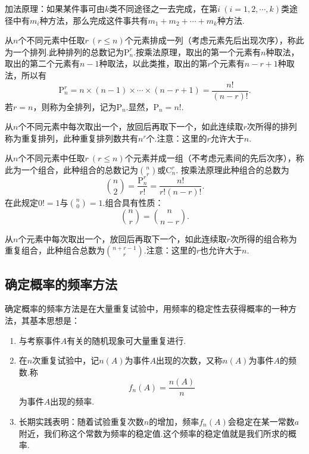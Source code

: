 加法原理：如果某件事可由$k$类不同途径之一去完成，在第$i\ (i=1,2,\cdots,k)$类途径中有$m_i$种方法，那么完成这件事共有$m_1+m_2+\cdots+m_k$种方法.
\begin{definition}[排列]
	从$n$个不同元素中任取$r\ (r\leqslant n)$个元素排成一列（考虑元素先后出现次序），称此为一个{\heiti 排列}.此种排列的总数记为$\mathrm{P}_n^r$.按乘法原理，取出的第一个元素有$n$种取法，取出的第二个元素有$n-1$种取法，以此类推，取出的第$r$个元素有$n-r+1$种取法，所以有
	$$\mathrm{P}_n^r=n\times(n-1)\times\cdots\times(n-r+1)=\frac{n!}{(n-r)!}.$$
	若$r=n$，则称为{\heiti 全排列}，记为$\mathrm{P}_n$.显然，$\mathrm{P}_n=n!$.
\end{definition}
\begin{definition}[重复排列]
	从$n$个不同元素中每次取出一个，放回后再取下一个，如此连续取$r$次所得的排列称为{\heiti 重复排列}，此种重复排列数共有$n^r$个.注意：这里的$r$允许大于$n$.
\end{definition}
\begin{definition}[组合]
	从$n$个不同元素中任取$r\ (r\leqslant n)$个元素并成一组（不考虑元素间的先后次序），称此为一个{\heiti 组合}，此种组合的总数记为${n \choose r}$或$\mathrm{C}_n^r$. 按乘法原理此种组合的总数为
	$${n\choose 2}=\frac{\mathrm{P}_n^r}{r!}=\frac{n!}{r!(n-r)!}.$$
	在此规定$0!=1$与${n\choose 0}=1$.组合具有性质：
	$${n\choose r}={n\choose n-r}.$$
\end{definition}
\begin{definition}[重复组合]
	从$n$个元素中每次取出一个，放回后再取下一个，如此连续取$r$次所得的组合称为{\heiti 重复组合}，此种组合总数为${n+r-1\choose r}$.注意：这里的$r$也允许大于$n$.
\end{definition}
\subsection{确定概率的频率方法}
确定概率的频率方法是在大量重复试验中，用频率的稳定性去获得概率的一种方法，其基本思想是：
\begin{enumerate}[(1)]
	\item 与考察事件$A$有关的随机现象可大量重复进行.
	\item 在$n$次重复试验中，记$n(A)$为事件$A$出现的次数，又称$n(A)$为事件$A$的{\heiti 频数}.称
	$$f_n(A)=\frac{n(A)}{n}$$
	为事件$A$出现的{\heiti 频率}.
	\item 长期实践表明：随着试验重复次数$n$的增加，频率$f_n(A)$会稳定在某一常数$a$附近，我们称这个常数为{\heiti 频率的稳定值}.这个频率的稳定值就是我们所求的概率.
\end{enumerate}

